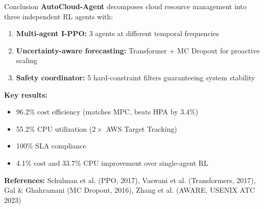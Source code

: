 \documentclass[aspectratio=169,11pt]{beamer}
\begin{document}
\begin{frame}{Conclusion}
\textbf{AutoCloud-Agent} decomposes cloud resource management into three
independent RL agents with:

\vspace{0.3cm}
\begin{enumerate}
  \item \textbf{Multi-agent I-PPO:} 3 agents at different temporal frequencies
  \item \textbf{Uncertainty-aware forecasting:} Transformer + MC Dropout for proactive scaling
  \item \textbf{Safety coordinator:} 5 hard-constraint filters guaranteeing system stability
\end{enumerate}

\vspace{0.3cm}
\textbf{Key results:}
\begin{itemize}
  \item 96.2\% cost efficiency (matches MPC, beats HPA by 3.4\%)
  \item 55.2\% CPU utilization ($2\times$ AWS Target Tracking)
  \item 100\% SLA compliance
  \item 4.1\% cost and 33.7\% CPU improvement over single-agent RL
\end{itemize}

\vspace{0.3cm}
\textbf{References:} Schulman et al. (PPO, 2017), Vaswani et al. (Transformers, 2017), Gal \& Ghahramani (MC Dropout, 2016), Zhang et al. (AWARE, USENIX ATC 2023)
\end{frame}
\end{document}
